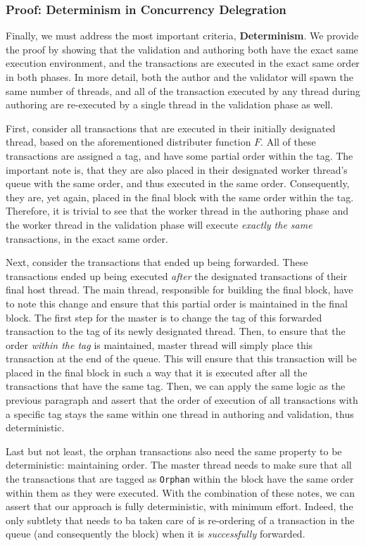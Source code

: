 \subsubsection{Proof: Determinism in Concurrency Delegration}

Finally, we must address the most important criteria, \textbf{Determinism}. We provide the proof by
showing that the validation and authoring both have the exact same execution environment, and the
transactions are executed in the exact same order in both phases. In more detail, both the author
and the validator will spawn the same number of threads, and all of the transaction executed by any
thread during authoring are re-executed by a single thread in the validation phase as well.

First, consider all transactions that are executed in their initially designated thread, based on
the aforementioned distributer function $F$. All of these transactions are assigned a tag, and have
some partial order within the tag. The important note is, that they are also placed in their
designated worker thread's queue with the same order, and thus executed in the same order.
Consequently, they are, yet again, placed in the final block with the same order within the tag.
Therefore, it is trivial to see that the worker thread in the authoring phase and the worker thread
in the validation phase will execute \textit{exactly the same} transactions, in the exact same
order.

Next, consider the transactions that ended up being forwarded. These transactions ended up being
executed \textit{after} the designated transactions of their final host thread. The main thread,
responsible for building the final block, have to note this change and ensure that this partial
order is maintained in the final block. The first step for the master is to change the tag of this
forwarded transaction to the tag of its newly designated thread. Then, to ensure that the order
\textit{within the tag} is maintained, master thread will simply place this transaction at the end
of the queue. This will ensure that this transaction will be placed in the final block in such a way
that it is executed after all the transactions that have the same tag. Then, we can apply the same
logic as the previous paragraph and assert that the order of execution of all transactions with a
specific tag stays the same within one thread in authoring and validation, thus deterministic.

Last but not least, the orphan transactions also need the same property to be deterministic:
maintaining order. The master thread needs to make sure that all the transactions that are tagged as
\texttt{Orphan} within the block have the same order within them as they were executed. With the
combination of these notes, we can assert that our approach is fully deterministic, with minimum
effort. Indeed, the only subtlety that needs to ba taken care of is re-ordering of a transaction in
the queue (and consequently the block) when it is \textit{successfully} forwarded.


